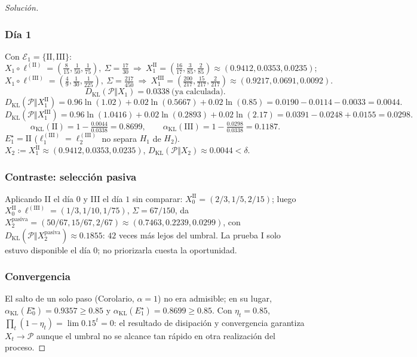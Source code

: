 \documentclass[12pt]{article}
\begin{document}
\begin{proof}[Solución]
\subsubsection*{Día 1}
Con $\mathcal E_1=\{\mathrm{II},\mathrm{III}\}$:
\[
X_1\circ\ell^{(\mathrm{II})}=\left(\tfrac{8}{15},\tfrac{1}{50},\tfrac{1}{75}\right),\ \Sigma=\tfrac{17}{30}
\ \Rightarrow\
X_1^{\mathrm{II}}=\left(\tfrac{16}{17},\tfrac{3}{85},\tfrac{2}{85}\right)\approx(0.9412,0.0353,0.0235);
\]
\[
X_1\circ\ell^{(\mathrm{III})}=\left(\tfrac{4}{9},\tfrac{1}{30},\tfrac{1}{225}\right),\ \Sigma=\tfrac{217}{450}
\ \Rightarrow\
X_1^{\mathrm{III}}=\left(\tfrac{200}{217},\tfrac{15}{217},\tfrac{2}{217}\right)\approx(0.9217,0.0691,0.0092).
\]
\[
D_{\mathrm{KL}}(\mathcal P\Vert X_1)=0.0338\ \text{(ya calculada)}.
\]
\[
D_{\mathrm{KL}}(\mathcal P\Vert X_1^{\mathrm{II}})=0.96\ln(1.02)+0.02\ln(0.5667)+0.02\ln(0.85)=0.0190-0.0114-0.0033=0.0044.
\]
\[
D_{\mathrm{KL}}(\mathcal P\Vert X_1^{\mathrm{III}})=0.96\ln(1.0416)+0.02\ln(0.2893)+0.02\ln(2.17)=0.0391-0.0248+0.0155=0.0298.
\]
\[
\alpha_{\mathrm{KL}}(\mathrm{II})=1-\tfrac{0.0044}{0.0338}=0.8699,\qquad
\alpha_{\mathrm{KL}}(\mathrm{III})=1-\tfrac{0.0298}{0.0338}=0.1187.
\]
$E_1^\star=\mathrm{II}$ ($\ell_1^{(\mathrm{III})}=\ell_2^{(\mathrm{III})}$ no separa $H_1$ de $H_2$). $X_2:=X_1^{\mathrm{II}}\approx(0.9412,0.0353,0.0235)$, $D_{\mathrm{KL}}(\mathcal P\Vert X_2)\approx0.0044<\delta$.

\subsubsection*{Contraste: selección pasiva}
Aplicando II el día $0$ y III el día $1$ sin comparar: $X_0^{\mathrm{II}}=(2/3,1/5,2/15)$; luego $X_0^{\mathrm{II}}\circ\ell^{(\mathrm{III})}=(1/3,1/10,1/75)$, $\Sigma=67/150$, da $X_2^{\text{pasiva}}=(50/67,15/67,2/67)\approx(0.7463,0.2239,0.0299)$, con $D_{\mathrm{KL}}(\mathcal P\Vert X_2^{\text{pasiva}})\approx0.1855$: $42$ veces más lejos del umbral. La prueba I solo estuvo disponible el día $0$; no priorizarla cuesta la oportunidad.

\subsubsection*{Convergencia}
El salto de un solo paso (Corolario, $\alpha=1$) no era admisible; en su lugar, $\alpha_{\mathrm{KL}}(E_0^\star)=0.9357\ge0.85$ y $\alpha_{\mathrm{KL}}(E_1^\star)=0.8699\ge0.85$. Con $\eta_t=0.85$, $\prod_t(1-\eta_t)=\lim 0.15^t=0$: el resultado de disipación y convergencia garantiza $X_t\to\mathcal P$ aunque el umbral no se alcance tan rápido en otra realización del proceso.
\end{proof}
\end{document}
